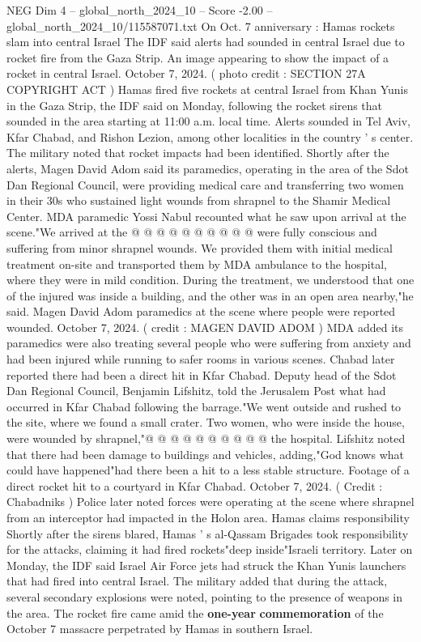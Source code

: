 \begin{textsample}{NEG Dim 4 – global\_north\_2024\_10 – Score -2.00 – global\_north\_2024\_10/115587071.txt}  \label{ex:f4_neg_051}
On Oct. 7 anniversary : Hamas rockets slam into central Israel The IDF said alerts had sounded in central Israel due to rocket fire from the Gaza Strip.
An image appearing to show the impact of a rocket in central Israel.
October 7, 2024. ( photo credit : SECTION 27A COPYRIGHT ACT ) Hamas fired five rockets at central Israel from Khan Yunis in the Gaza Strip, the IDF said on Monday, following the rocket sirens that sounded in the area starting at 11:00 a.m. local time.
Alerts sounded in Tel Aviv, Kfar Chabad, and Rishon Lezion, among other localities in the country ' s center.
The military noted that rocket impacts had been identified.
Shortly after the alerts, Magen David Adom said its paramedics, operating in the area of the Sdot Dan Regional Council, were providing medical care and transferring two women in their 30s who sustained light wounds from shrapnel to the Shamir Medical Center.
MDA paramedic Yossi Nabul recounted what he saw upon arrival at the scene."We arrived at the @ @ @ @ @ @ @ @ @ @ were fully conscious and suffering from minor shrapnel wounds.
We provided them with initial medical treatment on-site and transported them by MDA ambulance to the hospital, where they were in mild condition.
During the treatment, we understood that one of the injured was inside a building, and the other was in an open area nearby,"he said.
Magen David Adom paramedics at the scene where people were reported wounded.
October 7, 2024. ( credit : MAGEN DAVID ADOM ) MDA added its paramedics were also treating several people who were suffering from anxiety and had been injured while running to safer rooms in various scenes.
Chabad later reported there had been a direct hit in Kfar Chabad.
Deputy head of the Sdot Dan Regional Council, Benjamin Lifshitz, told the Jerusalem Post what had occurred in Kfar Chabad following the barrage."We went outside and rushed to the site, where we found a small crater.
Two women, who were inside the house, were wounded by shrapnel,"@ @ @ @ @ @ @ @ @ @ the hospital.
Lifshitz noted that there had been damage to buildings and vehicles, adding,"God knows what could have happened"had there been a hit to a less stable structure.
Footage of a direct rocket hit to a courtyard in Kfar Chabad.
October 7, 2024. ( Credit : Chabadniks ) Police later noted forces were operating at the scene where shrapnel from an interceptor had impacted in the Holon area.
Hamas claims responsibility Shortly after the sirens blared, Hamas ' s al-Qassam Brigades took responsibility for the attacks, claiming it had fired rockets"deep inside"Israeli territory.
Later on Monday, the IDF said Israel Air Force jets had struck the Khan Yunis launchers that had fired into central Israel.
The military added that during the attack, several secondary explosions were noted, pointing to the presence of weapons in the area.
The rocket fire came amid the \textbf{one-year} \textbf{commemoration} of the October 7 massacre perpetrated by Hamas in southern Israel.

\end{textsample}
